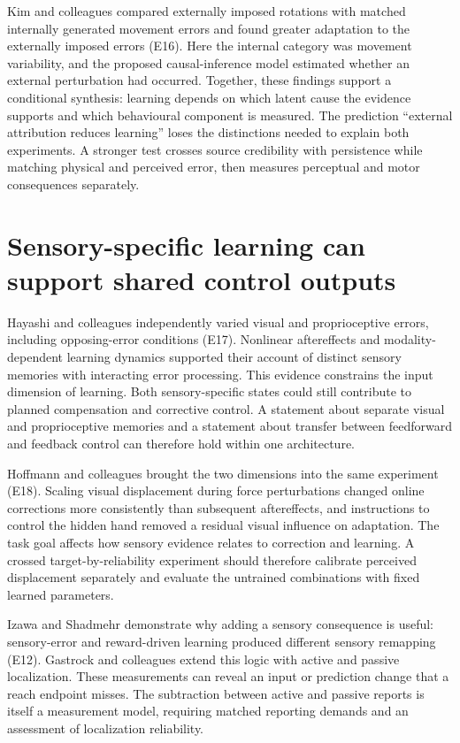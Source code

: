 \documentclass[11pt,a4paper]{article}
\begin{document}
Kim and colleagues compared externally imposed rotations with matched internally generated movement errors and found greater adaptation to the externally imposed errors (E16). Here the internal category was movement variability, and the proposed causal-inference model estimated whether an external perturbation had occurred. Together, these findings support a conditional synthesis: learning depends on which latent cause the evidence supports and which behavioural component is measured. The prediction ``external attribution reduces learning'' loses the distinctions needed to explain both experiments. A stronger test crosses source credibility with persistence while matching physical and perceived error, then measures perceptual and motor consequences separately. \cite{piece2025}

\section{Sensory-specific learning can support shared control outputs}
Hayashi and colleagues independently varied visual and proprioceptive errors, including opposing-error conditions (E17). Nonlinear aftereffects and modality-dependent learning dynamics supported their account of distinct sensory memories with interacting error processing. This evidence constrains the input dimension of learning. Both sensory-specific states could still contribute to planned compensation and corrective control. A statement about separate visual and proprioceptive memories and a statement about transfer between feedforward and feedback control can therefore hold within one architecture. \cite{hayashi2020}

Hoffmann and colleagues brought the two dimensions into the same experiment (E18). Scaling visual displacement during force perturbations changed online corrections more consistently than subsequent aftereffects, and instructions to control the hidden hand removed a residual visual influence on adaptation. The task goal affects how sensory evidence relates to correction and learning. A crossed target-by-reliability experiment should therefore calibrate perceived displacement separately and evaluate the untrained combinations with fixed learned parameters. \cite{hoffmann2023}

Izawa and Shadmehr demonstrate why adding a sensory consequence is useful: sensory-error and reward-driven learning produced different sensory remapping (E12). Gastrock and colleagues extend this logic with active and passive localization. These measurements can reveal an input or prediction change that a reach endpoint misses. The subtraction between active and passive reports is itself a measurement model, requiring matched reporting demands and an assessment of localization reliability. \cite{izawa2011,external2020}
\end{document}
